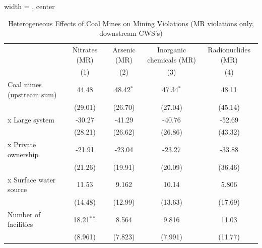 
\begin{table}[htbp]
   
   \caption{\label{tab:2sls_het_unified_minevio_ivsum_mr} Heterogeneous Effects of Coal Mines on Mining Violations (MR violations only, downstream CWS's)}
   \bigskip
   
   \centering
   
   \begin{adjustbox}{width = \textwidth, center}
      
      
      \begin{tabular}{lcccc}
         \toprule
         
                                                       & Nitrates (MR) & Arsenic (MR)  & Inorganic chemicals (MR) & Radionuclides (MR)\\  
         
                                                       & (1)           & (2)           & (3)                      & (4)\\  
         
         \midrule 
         Coal mines (upstream sum)                     & 44.48         & 48.42$^{*}$   & 47.34$^{*}$              & 48.11\\   
                                                       & (29.01)       & (26.70)       & (27.04)                  & (45.14)\\   
           x Large system                              & -30.27        & -41.29        & -40.76                   & -52.69\\   
                                                       & (28.21)       & (26.62)       & (26.86)                  & (43.32)\\   
           x Private ownership                         & -21.91        & -23.04        & -23.27                   & -33.88\\   
                                                       & (21.26)       & (19.91)       & (20.09)                  & (36.46)\\   
           x Surface water source                      & 11.53         & 9.162         & 10.14                    & 5.806\\   
                                                       & (14.48)       & (12.99)       & (13.63)                  & (17.69)\\   
         Number of facilities                          & 18.21$^{**}$  & 8.564         & 9.816                    & 11.03\\   
                                                       & (8.961)       & (7.823)       & (7.991)                  & (11.77)\\   
         

\end{tabular}
\end{adjustbox}
\end{table}
